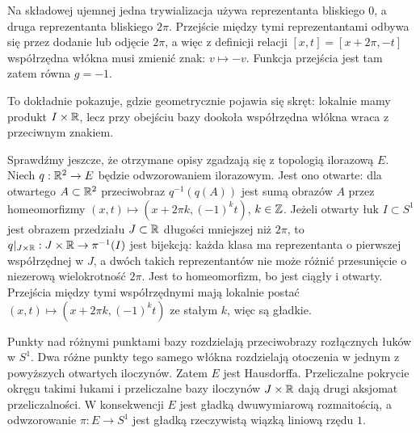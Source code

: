 \begin{przyklad}
Na składowej ujemnej jedna trywializacja używa reprezentanta bliskiego $0$,
a druga reprezentanta bliskiego $2\pi$.
Przejście między tymi reprezentantami odbywa się przez dodanie lub odjęcie
$2\pi$, a więc z definicji relacji
$
[x,t]=[x+2\pi,-t]
$
współrzędna włókna musi zmienić znak:
$
v\longmapsto -v.
$
Funkcja przejścia jest tam zatem równa
$
g=-1.
$

To dokładnie pokazuje, gdzie geometrycznie pojawia się skręt:
lokalnie mamy produkt $I\times\mathbb{R}$, lecz przy obejściu bazy dookoła
współrzędna włókna wraca z przeciwnym znakiem.

\medskip
Sprawdźmy jeszcze, że otrzymane opisy zgadzają się z topologią
ilorazową $E$. Niech $q:\mathbb{R}^2\to E$ będzie odwzorowaniem ilorazowym.
Jest ono otwarte: dla otwartego $A\subset\mathbb{R}^2$ przeciwobraz
$q^{-1}(q(A))$ jest sumą obrazów $A$ przez homeomorfizmy
$(x,t)\mapsto(x+2\pi k,(-1)^k t)$, $k\in\mathbb{Z}$.
Jeżeli otwarty łuk $I\subset S^1$ jest obrazem przedziału
$J\subset\mathbb{R}$ długości mniejszej niż $2\pi$, to
$q|_{J\times\mathbb{R}}:J\times\mathbb{R}\to\pi^{-1}(I)$ jest bijekcją:
każda klasa ma reprezentanta o pierwszej współrzędnej w $J$,
a dwóch takich reprezentantów nie może różnić przesunięcie
o niezerową wielokrotność $2\pi$. Jest to homeomorfizm,
bo jest ciągły i otwarty. Przejścia między tymi współrzędnymi
mają lokalnie postać
$(x,t)\mapsto(x+2\pi k,(-1)^k t)$ ze stałym $k$,
więc są gładkie.

Punkty nad różnymi punktami bazy rozdzielają przeciwobrazy
rozłącznych łuków w $S^1$. Dwa różne punkty tego samego
włókna rozdzielają otoczenia w jednym z powyższych
otwartych iloczynów. Zatem $E$ jest Hausdorffa.
Przeliczalne pokrycie okręgu takimi łukami i przeliczalne
bazy iloczynów $J\times\mathbb{R}$ dają drugi aksjomat
przeliczalności. W konsekwencji $E$ jest gładką
dwuwymiarową rozmaitością, a odwzorowanie
$
\pi\colon E\to S^1
$
jest gładką rzeczywistą wiązką liniową rzędu $1$.

\end{przyklad}

